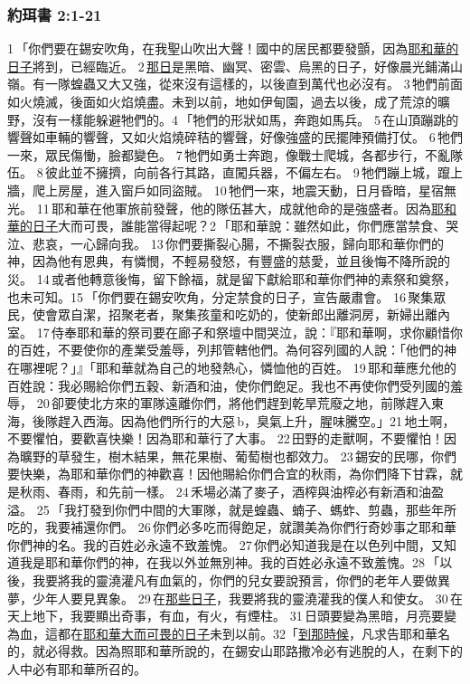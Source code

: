 \subsubsection{約珥書 2:1-21}
1 「你們要在錫安吹角，在我聖山吹出大聲！國中的居民都要發顫，因為\underline{耶和華的日子}將到，已經臨近。 2 \underline{那日}是黑暗、幽冥、密雲、烏黑的日子，好像晨光鋪滿山嶺。有一隊蝗蟲又大又強，從來沒有這樣的，以後直到萬代也必沒有。 3 牠們前面如火燒滅，後面如火焰燒盡。未到以前，地如伊甸園，過去以後，成了荒涼的曠野，沒有一樣能躲避牠們的。4 「牠們的形狀如馬，奔跑如馬兵。 5 在山頂蹦跳的響聲如車輛的響聲，又如火焰燒碎秸的響聲，好像強盛的民擺陣預備打仗。 6 牠們一來，眾民傷慟，臉都變色。 7 牠們如勇士奔跑，像戰士爬城，各都步行，不亂隊伍。 8 彼此並不擁擠，向前各行其路，直闖兵器，不偏左右。 9 牠們蹦上城，躥上牆，爬上房屋，進入窗戶如同盜賊。 10 牠們一來，地震天動，日月昏暗，星宿無光。 11 耶和華在他軍旅前發聲，他的隊伍甚大，成就他命的是強盛者。因為\underline{耶和華的日子}大而可畏，誰能當得起呢？2 「耶和華說：雖然如此，你們應當禁食、哭泣、悲哀，一心歸向我。 13 你們要撕裂心腸，不撕裂衣服，歸向耶和華你們的神，因為他有恩典，有憐憫，不輕易發怒，有豐盛的慈愛，並且後悔不降所說的災。 14 或者他轉意後悔，留下餘福，就是留下獻給耶和華你們神的素祭和奠祭，也未可知。15 「你們要在錫安吹角，分定禁食的日子，宣告嚴肅會。 16 聚集眾民，使會眾自潔，招聚老者，聚集孩童和吃奶的，使新郎出離洞房，新婦出離內室。 17 侍奉耶和華的祭司要在廊子和祭壇中間哭泣，說：『耶和華啊，求你顧惜你的百姓，不要使你的產業受羞辱，列邦管轄他們。為何容列國的人說：「他們的神在哪裡呢？」』「耶和華就為自己的地發熱心，憐恤他的百姓。 19 耶和華應允他的百姓說：我必賜給你們五穀、新酒和油，使你們飽足。我也不再使你們受列國的羞辱， 20 卻要使北方來的軍隊遠離你們，將他們趕到乾旱荒廢之地，前隊趕入東海，後隊趕入西海。因為他們所行的大惡 b，臭氣上升，腥味騰空。」21 地土啊，不要懼怕，要歡喜快樂！因為耶和華行了大事。 22 田野的走獸啊，不要懼怕！因為曠野的草發生，樹木結果，無花果樹、葡萄樹也都效力。 23 錫安的民哪，你們要快樂，為耶和華你們的神歡喜！因他賜給你們合宜的秋雨，為你們降下甘霖，就是秋雨、春雨，和先前一樣。 24 禾場必滿了麥子，酒榨與油榨必有新酒和油盈溢。 25 「我打發到你們中間的大軍隊，就是蝗蟲、蝻子、螞蚱、剪蟲，那些年所吃的，我要補還你們。 26 你們必多吃而得飽足，就讚美為你們行奇妙事之耶和華你們神的名。我的百姓必永遠不致羞愧。 27 你們必知道我是在以色列中間，又知道我是耶和華你們的神，在我以外並無別神。我的百姓必永遠不致羞愧。28 「以後，我要將我的靈澆灌凡有血氣的，你們的兒女要說預言，你們的老年人要做異夢，少年人要見異象。 29 在\underline{那些日子}，我要將我的靈澆灌我的僕人和使女。 30 在天上地下，我要顯出奇事，有血，有火，有煙柱。 31 日頭要變為黑暗，月亮要變為血，這都在\underline{耶和華大而可畏的日子}未到以前。32「\underline{到那時候}，凡求告耶和華名的，就必得救。因為照耶和華所說的，在錫安山耶路撒冷必有逃脫的人，在剩下的人中必有耶和華所召的。


